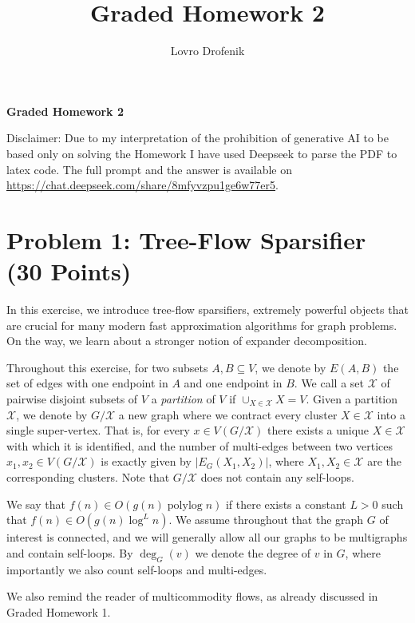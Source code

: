 \documentclass[a4paper,11pt]{article}
\title{Graded Homework 2}
\author{Lovro Drofenik}
\DeclareMathOperator{\polylog}{polylog}
\DeclareMathOperator{\degG}{deg}
\renewcommand{\deg}{\degG} %
\begin{document}
\maketitle

\noindent\textbf{Graded Homework 2}

Disclaimer: Due to my interpretation of the prohibition of generative AI to be based only on solving the Homework I have used Deepseek to parse the PDF to latex code. The full prompt and the answer is available on \url{https://chat.deepseek.com/share/8mfyvzpu1ge6w77er5}.

\section*{Problem 1: Tree-Flow Sparsifier (30 Points)}

In this exercise, we introduce tree-flow sparsifiers, extremely powerful objects that are crucial for many modern fast approximation algorithms for graph problems. On the way, we learn about a stronger notion of expander decomposition.

Throughout this exercise, for two subsets \(A,B\subseteq V\), we denote by \(E(A,B)\) the set of edges with one endpoint in \(A\) and one endpoint in \(B\). We call a set \(\mathcal{X}\) of pairwise disjoint subsets of \(V\) a \emph{partition} of \(V\) if \(\cup_{X\in \mathcal{X}}X = V\). Given a partition \(\mathcal{X}\), we denote by \(G / \mathcal{X}\) a new graph where we contract every cluster \(X\in \mathcal{X}\) into a single super-vertex. That is, for every \(x\in V(G / \mathcal{X})\) there exists a unique \(X\in \mathcal{X}\) with which it is identified, and the number of multi-edges between two vertices \(x_1,x_2\in V(G / \mathcal{X})\) is exactly given by \(|E_G(X_1,X_2)|\), where \(X_1,X_2\in \mathcal{X}\) are the corresponding clusters. Note that \(G / \mathcal{X}\) does not contain any self-loops.

We say that \(f(n)\in O(g(n)\polylog n)\) if there exists a constant \(L > 0\) such that \(f(n)\in O(g(n)\log^L n)\). We assume throughout that the graph \(G\) of interest is connected, and we will generally allow all our graphs to be multigraphs and contain self-loops. By \(\deg_{G}(v)\) we denote the degree of \(v\) in \(G\), where importantly we also count self-loops and multi-edges.

We also remind the reader of multicommodity flows, as already discussed in Graded Homework 1.
\end{document}
